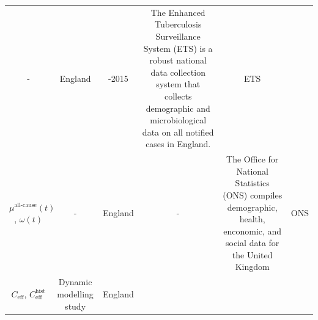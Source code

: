 \documentclass[11pt,twoside]{bristolthesis}
\begin{document}
\begin{longtable}[]{@{}cccccc@{}}
\begin{minipage}[t]{0.09\columnwidth}
  -\strut
  \end{minipage} & \begin{minipage}[t]{0.07\columnwidth}\centering
  England\strut
  \end{minipage} & \begin{minipage}[t]{0.07\columnwidth}\centering
  2000-2015\strut
  \end{minipage} & \begin{minipage}[t]{0.31\columnwidth}\centering
  The Enhanced Tuberculosis Surveillance System
  (ETS) is a robust national data collection system
  that collects demographic and microbiological data
  on all notified cases in England.\strut
  \end{minipage} & \begin{minipage}[t]{0.10\columnwidth}\centering
  ETS\strut
  \end{minipage}\tabularnewline
  \begin{minipage}[t]{0.19\columnwidth}\centering
  \(\mu^{\text{all-cause}}(t)\),
  \(\omega(t)\)\strut
  \end{minipage} & \begin{minipage}[t]{0.09\columnwidth}\centering
  -\strut
  \end{minipage} & \begin{minipage}[t]{0.07\columnwidth}\centering
  England\strut
  \end{minipage} & \begin{minipage}[t]{0.07\columnwidth}\centering
  -\strut
  \end{minipage} & \begin{minipage}[t]{0.31\columnwidth}\centering
  The Office for National Statistics (ONS) compiles
  demographic, health, enconomic, and social data
  for the United Kingdom\strut
  \end{minipage} & \begin{minipage}[t]{0.10\columnwidth}\centering
  ONS\strut
  \end{minipage}\tabularnewline
  \begin{minipage}[t]{0.19\columnwidth}\centering
  \(C_{\text{eff}}\),
  \(C^{\text{hist}}_{\text{eff}}\)\strut
  \end{minipage} & \begin{minipage}[t]{0.09\columnwidth}\centering
  Dynamic
  modelling
  study\strut
  \end{minipage} & \begin{minipage}[t]{0.07\columnwidth}\centering
  England\strut
  \end{minipage} & \begin{minipage}[t]{0.07\columnwidth}\centering

\end{minipage}
\end{longtable}
\end{document}
